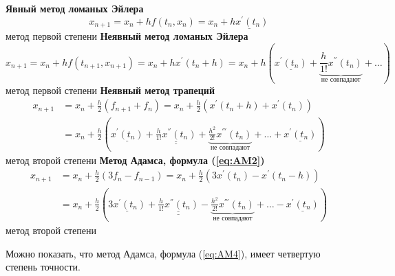 \documentclass[a4paper,11pt]{article}
\begin{document}
\begin{importantblock}
  \begin{center}
    \textbf{Явный метод ломаных Эйлера}
    \[x_{n+1} = x_n + hf(t_n, x_n) = x_n + \underline{hx^{'}(t_n)}\]
    \small{метод первой степени}
    \textbf{Неявный метод ломаных Эйлера}
    \[x_{n+1} = x_n + hf(t_{n+1}, x_{n+1}) = x_n + hx^{'}(t_n + h) = x_n + h(\underline{x^{'}(t_n)} + \underbrace{\frac{h}{1!}x^{''}(t_n)}_{\text{не совпадают}} + \dots)\]
    \small{метод первой степени}
    \textbf{Неявный метод трапеций}
    \begin{align*}
      x_{n+1} &= x_n + \frac{h}{2}(f_{n+1} + f_n) = x_n + \frac{h}{2}(x^{'}(t_n+h)+x^{'}(t_n)) \\
              &= x_n + \frac{h}{2}(\underline{x^{'}(t_n)} + \underline{\underline{\frac{h}{1!}x^{''}(t_n)}} + \underbrace{\frac{h^2}{2!}x^{'''}(t_n)}_{\text{не совпадают}} + \dots + \underline{x^{'}(t_n)})
    \end{align*}
    \small{метод второй степени}
    \textbf{Метод Адамса, формула (\ref{eq:AM2})}
    \begin{align*}
      x_{n+1} &= x_n + \frac{h}{2}(3f_n - f_{n-1}) = x_n + \frac{h}{2}(3x^{'}(t_n)-x^{'}(t_n-h)) \\
              &= x_n + \frac{h}{2}(\underline{3x^{'}(t_n)} + \underline{\underline{\frac{h}{1!}x^{''}(t_n)}} - \underbrace{\frac{h^2}{2!}x^{'''}(t_n)}_{\text{не совпадают}} + \dots - \underline{x^{'}(t_n)})
    \end{align*}
    \small{метод второй степени}
  \end{center}
  Можно показать, что метод Адамса, формула (\ref{eq:AM4}), имеет четвертую степень точности.
\end{importantblock}
\end{document}
